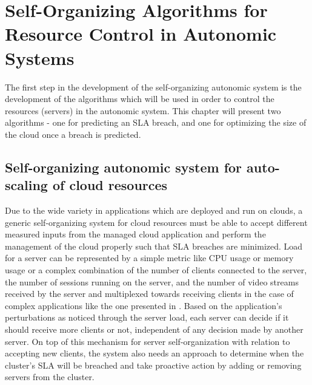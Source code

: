 \chapter{Self-Organizing Algorithms for Resource Control in Autonomic Systems} %
\label{Chapter_selforg}

The first step in the development of the self-organizing autonomic system is the development of the algorithms which will be used in order to control the resources (servers) in the autonomic system. This chapter will present two algorithms - one for predicting an SLA breach, and one for optimizing the size of the cloud once a breach is predicted.

\section{Self-organizing autonomic system for auto-scaling of cloud resources}

Due to the wide variety in applications which are deployed and run on clouds, a generic self-organizing system for cloud resources must be able to accept different measured inputs from the managed cloud application and perform the management of the cloud properly such that SLA breaches are minimized. Load for a server can be represented by a simple metric like CPU usage or memory usage or a complex combination of the number of clients connected to the server, the number of sessions running on the server, and the number of video streams received by the server and multiplexed towards receiving clients in the case of complex applications like the one presented in \cite{bogdan:miles2012chapter}. Based on the application's perturbations as noticed through the server load, each server can decide if it should receive more clients or not, independent of any decision made by another server. On top of this mechanism for server self-organization with relation to accepting new clients, the system also needs an approach to determine when the cluster's SLA will be breached and take proactive action by adding or removing servers from the cluster.

